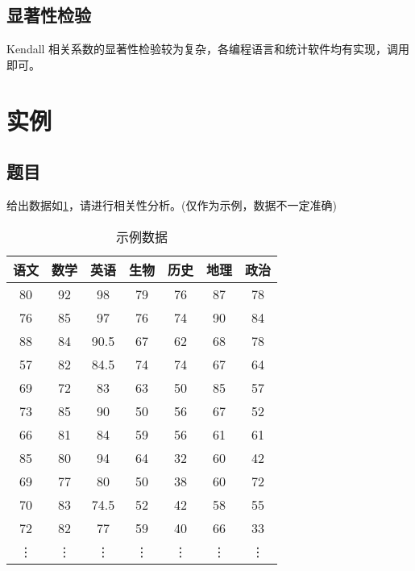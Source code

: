 \documentclass[withoutpreface]{cumcmthesis}
\begin{document}
\subsection{显著性检验}

Kendall 相关系数的显著性检验较为复杂，各编程语言和统计软件均有实现，调用即可。

\section{实例}

\subsection{题目}
给出数据如\cref{Tab:1}，请进行相关性分析。(仅作为示例，数据不一定准确)

\begin{table}[H]
    \centering
    \caption{示例数据}\label{Tab:1}
    \begin{tabular}{|c|c|c|c|c|c|c|}
        \hline
        语文     & 数学     & 英语     & 生物     & 历史     & 地理     & 政治           \\
        \hline
        80     & 92     & 98     & 79     & 76     & 87     & 78 \bigstrut \\
        \hline
        76     & 85     & 97     & 76     & 74     & 90     & 84 \bigstrut \\
        \hline
        88     & 84     & 90.5   & 67     & 62     & 68     & 78 \bigstrut \\
        \hline
        57     & 82     & 84.5   & 74     & 74     & 67     & 64 \bigstrut \\
        \hline
        69     & 72     & 83     & 63     & 50     & 85     & 57 \bigstrut \\
        \hline
        73     & 85     & 90     & 50     & 56     & 67     & 52 \bigstrut \\
        \hline
        66     & 81     & 84     & 59     & 56     & 61     & 61 \bigstrut \\
        \hline
        85     & 80     & 94     & 64     & 32     & 60     & 42 \bigstrut \\
        \hline
        69     & 77     & 80     & 50     & 38     & 60     & 72 \bigstrut \\
        \hline
        70     & 83     & 74.5   & 52     & 42     & 58     & 55 \bigstrut \\
        \hline
        72     & 82     & 77     & 59     & 40     & 66     & 33 \bigstrut \\
        \hline
        \vdots & \vdots & \vdots & \vdots & \vdots & \vdots & \vdots       \\
        \hline
    \end{tabular}
\end{table}
\end{document}
